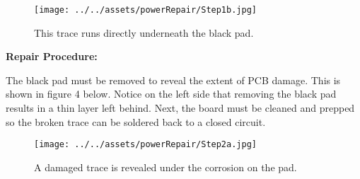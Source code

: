 \documentclass[11pt, letterpaper]{article}
\begin{document}
\begin{figure}[H] %
    \centering %
    \texttt{[image: ../../assets/powerRepair/Step1b.jpg]} %
    \caption{This trace runs directly underneath the black pad.} %
\end{figure}

\newpage
\begin{center}
    \textbf{Repair Procedure:}
\end{center}

\hspace{\parindent}The black pad must be removed to reveal the extent of PCB damage. This is shown in figure 4 
below. Notice on the left side that removing the black pad results in a thin layer left behind. Next, the board
must be cleaned and prepped so the broken trace can be soldered back to a closed circuit. 

\begin{figure}[H] %
    \centering %
    \texttt{[image: ../../assets/powerRepair/Step2a.jpg]} %
    \caption{A damaged trace is revealed under the corrosion on the pad.} %
\end{figure}
\end{document}
